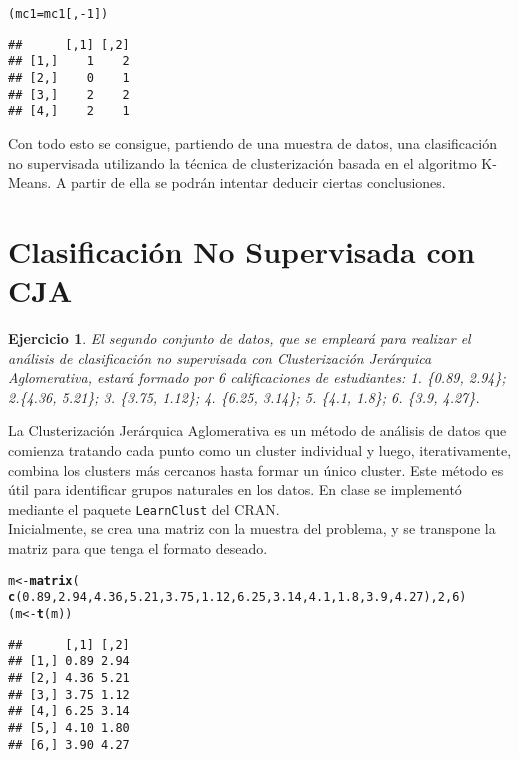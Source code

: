 \documentclass[12pt]{report}\usepackage[]{graphicx}\usepackage[dvipsnames]{xcolor}
\makeatletter
\newcommand{\hlnum}[1]{\textcolor[rgb]{0.686,0.059,0.569}{#1}}%
\newcommand{\hlopt}[1]{\textcolor[rgb]{0,0,0}{#1}}%
\newcommand{\hlstd}[1]{\textcolor[rgb]{0.345,0.345,0.345}{#1}}%
\newcommand{\hlkwb}[1]{\textcolor[rgb]{0.69,0.353,0.396}{#1}}%
\newcommand{\hlkwd}[1]{\textcolor[rgb]{0.737,0.353,0.396}{\textbf{#1}}}%
\newenvironment{kframe}{%
 \def\at@end@of@kframe{}%
 \ifinner\ifhmode%
  \def\at@end@of@kframe{\end{minipage}}%
  \begin{minipage}{\columnwidth}%
 \fi\fi%
 \def\FrameCommand##1{\hskip\@totalleftmargin \hskip-\fboxsep
 \colorbox{shadecolor}{##1}\hskip-\fboxsep
     \hskip-\linewidth \hskip-\@totalleftmargin \hskip\columnwidth}%
 \MakeFramed {\advance\hsize-\width
   \@totalleftmargin\z@ \linewidth\hsize
   \@setminipage}}%
 {\par\unskip\endMakeFramed%
 \at@end@of@kframe}
\newenvironment{knitrout}{}{} %
\newtheorem{exercise}{Ejercicio}[section]
\makeatother
\begin{document}
\begin{knitrout}
\color{fgcolor}\begin{kframe}
\begin{alltt}
\hlstd{(mc1} \hlkwb{=} \hlstd{mc1[,}\hlopt{-}\hlnum{1}\hlstd{])}
\end{alltt}
\begin{verbatim}
##      [,1] [,2]
## [1,]    1    2
## [2,]    0    1
## [3,]    2    2
## [4,]    2    1
\end{verbatim}
\end{kframe}
\end{knitrout}
	
	Con todo esto se consigue, partiendo de una muestra de datos, una clasificación no supervisada utilizando la técnica de clusterización basada en el algoritmo K-Means. A partir de ella se podrán intentar deducir ciertas conclusiones.
	
	\section{Clasificación No Supervisada con CJA}
	
	\begin{exercise}
		El segundo conjunto de datos, que se empleará para realizar el análisis de clasificación no supervisada con Clusterización Jerárquica Aglomerativa, estará formado por 6 calificaciones de estudiantes: 1. \{0.89, 2.94\}; 2.\{4.36, 5.21\}; 3. \{3.75, 1.12\}; 4. \{6.25, 3.14\}; 5. \{4.1, 1.8\}; 6. \{3.9, 4.27\}.
	\end{exercise}
	
	La Clusterización Jerárquica Aglomerativa es un método de análisis de datos que comienza tratando cada punto como un cluster individual y luego, iterativamente, combina los clusters más cercanos hasta formar un único cluster. Este método es útil para identificar grupos naturales en los datos. En clase se implementó mediante el paquete \texttt{LearnClust} del CRAN.\\
	
	Inicialmente, se crea una matriz con la muestra del problema, y se transpone la matriz para que tenga el formato deseado.
	
\begin{knitrout}
\color{fgcolor}\begin{kframe}
\begin{alltt}
\hlstd{m} \hlkwb{<-} \hlkwd{matrix}\hlstd{(}
        \hlkwd{c}\hlstd{(}\hlnum{0.89}\hlstd{,}\hlnum{2.94}\hlstd{,} \hlnum{4.36}\hlstd{,}\hlnum{5.21}\hlstd{,} \hlnum{3.75}\hlstd{,}\hlnum{1.12}\hlstd{,} \hlnum{6.25}\hlstd{,}\hlnum{3.14}\hlstd{,} \hlnum{4.1}\hlstd{,}\hlnum{1.8}\hlstd{,} \hlnum{3.9}\hlstd{,}\hlnum{4.27}\hlstd{),}\hlnum{2}\hlstd{,}\hlnum{6}\hlstd{)}
\hlstd{(m} \hlkwb{<-} \hlkwd{t}\hlstd{(m))}
\end{alltt}
\begin{verbatim}
##      [,1] [,2]
## [1,] 0.89 2.94
## [2,] 4.36 5.21
## [3,] 3.75 1.12
## [4,] 6.25 3.14
## [5,] 4.10 1.80
## [6,] 3.90 4.27
\end{verbatim}
\end{kframe}
\end{knitrout}
	
\end{document}
